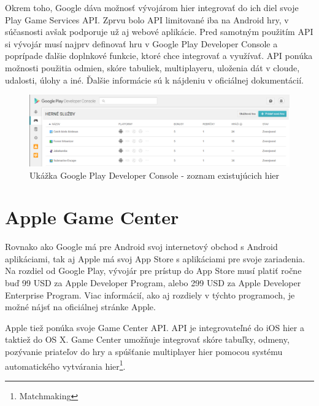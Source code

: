 Okrem toho, Google dáva možnosť vývojárom hier integrovať do ich diel svoje Play Game Services API. Zprvu bolo API limitované iba na Android hry, v súčasnosti avšak podporuje už aj webové aplikácie. Pred samotným použitím API si vývojár musí najprv definovať hru v Google Play Developer Console a poprípade ďalšie doplnkové funkcie, ktoré chce integrovať a využívať. API ponúka možnosti použitia odmien, skóre tabuliek, multiplayeru, uloženia dát v cloude, udalosti, úlohy a iné. Ďalšie informácie sú k nájdeniu v oficiálnej dokumentácií. \cite{google-developers}  
\begin{figure}[h]
  \centering
  \includegraphics[scale=0.32]{fig/google-play.png}
  \caption{Ukážka Google Play Developer Console  - zoznam existujúcich hier}
  \label{fig:google-play}
\end{figure}

\section{Apple Game Center}
Rovnako ako Google má pre Android svoj internetový obchod s Android aplikáciami, tak aj Apple má svoj App Store s aplikáciami pre svoje zariadenia. Na rozdiel od Google Play, vývojár pre prístup do App Store musí platiť ročne buď 99 USD za Apple Developer Program, alebo 299 USD za Apple Developer Enterprise Program. Viac informácií, ako aj rozdiely v týchto programoch, je možné nájsť na oficiálnej stránke Apple.  

Apple tiež ponúka svoje Game Center API. API je integrovateľné do iOS hier a taktiež do OS X. Game Center umožňuje integrovať skóre tabuľky, odmeny, pozývanie priateľov do hry a spúšťanie multiplayer hier pomocou systému automatického vytvárania hier\footnote{Matchmaking}. \cite{apple-developer}

